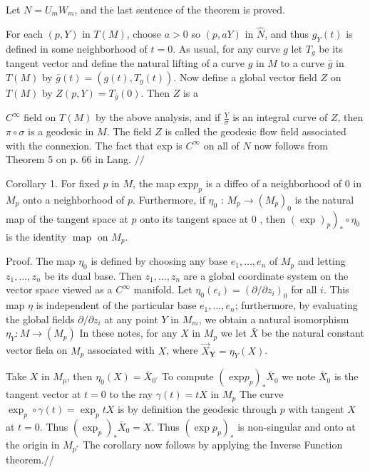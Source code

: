 \documentclass[10pt]{article}
\begin{document}
Let $N=U_{m} W_{m}$, and the last sentence of the theorem is proved.

For each $(p, Y)$ in $T(M)$, choose $a>0$ so $(p, a Y)$ in $\hat{N}$, and thus $g_{Y}(t)$ is defined in some neighborhood of $t=0$. As usual, for any curve $g$ let $T_{g}$ be its tangent vector and define the natural lifting of a curve $g$ in $M$ to a curve $\bar{g}$ in $T(M)$ by $\bar{g}(t)=\left(g(t), T_{g}(t)\right)$. Now define a global vector field $Z$ on $T(M)$ by $Z(p, Y)=T_{\bar{g}}(0)$. Then $Z$ is a

$C^{\infty}$ field on $T(M)$ by the above analysis, and if $\frac{Y}{\sigma}$ is an integral curve of $Z$, then $\pi \circ \sigma$ is a geodesic in $M$. The field $Z$ is called the geodesic flow field associated with the connexion. The fact that exp is $C^{\infty}$ on all of $N$ now follows from Theorem 5 on p. 66 in Lang. $/ /$

Corollary 1. For fixed $p$ in $M$, the map exp$p_{p}$ is a diffeo of a neighborhood of 0 in $M_{p}$ onto a neighborhood of $p$. Furthermore, if $\eta_{0}$ : $M_{p} \rightarrow\left(M_{p}\right)_{0}$ is the natural map of the tangent space at $p$ onto its tangent space at 0 , then $\left.(\exp )_{p}\right)_{*} \circ \eta_{0}$ is the identity $\operatorname{map}$ on $M_{p}$.

Proof. The map $\eta_{0}$ is defined by choosing any base $e_{1}, \ldots, e_{n}$ of $M_{p}$ and letting $z_{1}, \ldots, z_{n}$ be its dual base. Then $z_{1}, \ldots, z_{n}$ are a global coordinate system on the vector space viewed as a $C^{\infty}$ manifold. Let $\eta_{0}\left(e_{i}\right)=\left(\partial / \partial z_{i}\right)_{0}$ for all $i$. This map $\eta$ is independent of the particular base $e_{1}, \ldots, e_{n}$; furthermore, by evaluating the global fields $\partial / \partial z_{i}$ at any point $Y$ in $M_{m}$, we obtain a natural isomorphism $\eta_{Y}: M \rightarrow\left(M_{p}\right)$ In these notes, for any $X$ in $M_{p}$ we let $\bar{X}$ be the natural constant vector fiela on $M_{p}$ associated with $X$, where $\vec{X}_{\boldsymbol{Y}}=\eta_{Y}(X)$.

Take $X$ in $M_{p}$, then $\eta_{0}(X)=\bar{X}_{0^{\circ}}$ To compute $\left(\text { exp} p_{p}\right)_{*} \bar{X}_{0}$ we note $\bar{X}_{0}$ is the tangent vector at $t=0$ to the ray $\gamma(t)=t X$ in $M_{p}$ The curve $\exp _{p} \circ \gamma(t)=\exp _{p} t X$ is by definition the geodesic through $p$ with tangent $X$ at $t=0$. Thus $\left(\exp _{p}\right)_{*} \bar{X}_{0}=X$. Thus $\left(\exp p_{p}\right)_{*}$ is non-singular and onto at the origin in $M_{p^{*}}$ The corollary now follows by applying the Inverse Function theorem.//
\end{document}
